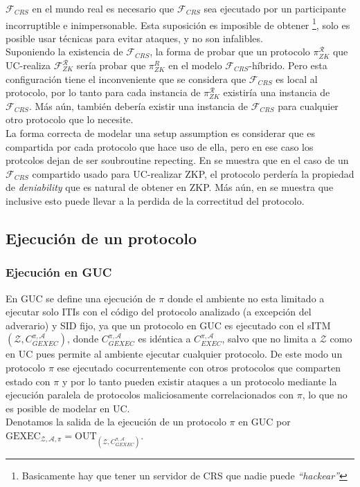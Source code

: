 $\mathcal{F}_{CRS}$ en el mundo real es necesario que $\mathcal{F}_{CRS}$ sea ejecutado por un participante
incorruptible e inimpersonable. Esta suposición es imposible de obtener
\footnote{Basicamente hay que tener un servidor de CRS que nadie puede \textit{``hackear''}},
solo es posible usar técnicas para evitar ataques, y no son infalibles.\\
Suponiendo la existencia de $\mathcal{F}_{CRS}$, la forma de probar que un protocolo $\pi_{ZK}^\mathcal{R}$
que UC-realiza $\mathcal{F}_{ZK}^\mathcal{R}$ sería probar que $\pi_{ZK}^{R}$ en el modelo
$\mathcal{F}_{CRS}$-híbrido. Pero esta configuración tiene el inconveniente que se considera que
$\mathcal{F}_{CRS}$ es local al protocolo, por lo tanto para cada instancia de $\pi_{ZK}^\mathcal{R}$
existiría una instancia de $\mathcal{F}_{CRS}$. Más aún, también debería existir una instancia de
$\mathcal{F}_{CRS}$ para cualquier otro protocolo que lo necesite.\\
La forma correcta de modelar una setup assumption es considerar que es compartida por cada protocolo
que hace uso de ella, pero en ese caso los protcolos dejan de ser soubroutine repecting.
En \cite{Pass03} se muestra que en el caso de un $\mathcal{F}_{CRS}$ compartido
usado para UC-realizar ZKP, el protocolo perdería la propiedad de \textit{deniability} que es natural
de obtener en ZKP. Más aún, en \cite{journals/tcs/YaoYZ09} se muestra que inclusive esto puede llevar
a la perdida de la correctitud del protocolo.\\

\subsection{Ejecución de un protocolo}

\subsubsection{Ejecución en GUC}

En GUC se define una ejecución de $\pi$ donde el ambiente no esta limitado a ejecutar solo ITIs con el código del
protocolo analizado (a excepción del adverario) y SID fijo, ya que un protocolo en GUC es ejecutado con el
sITM $(\mathcal{Z}, C_{GEXEC}^{\pi, \mathcal{A}})$, donde $C_{GEXEC}^{\pi, \mathcal{A}}$ es idéntica a
$C_{EXEC}^{\pi, \mathcal{A}}$, salvo que no limita a $\mathcal{Z}$ como en UC pues permite al ambiente ejecutar
cualquier protocolo. De este modo un protocolo $\pi$
ese ejecutado cocurrentemente con otros protocolos que comparten estado con $\pi$ y por lo tanto pueden existir
ataques a un protocolo mediante la ejecución paralela de protocolos
maliciosamente correlacionados con $\pi$, lo que no es posible de modelar en UC.\\ 
Denotamos la salida de la ejecución de un protocolo $\pi$ en GUC por
$\mathrm{GEXEC}_{
    \mathcal{Z},
    \mathcal{A},
    \pi}
=
\mathrm{OUT}_{(\mathcal{Z},
              C_{GEXEC}^{\pi, \mathcal{A}})}$.\\


